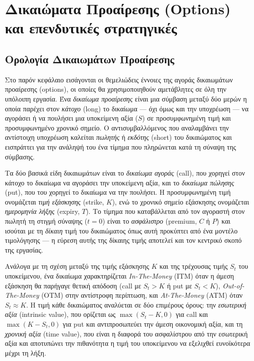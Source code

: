 \documentclass[12pt]{article}
\begin{document}
\newpage

\section{Δικαιώματα Προαίρεσης (Options) και επενδυτικές στρατηγικές}
\subsection{Ορολογία Δικαιωμάτων Προαίρεσης}

Στο παρόν κεφάλαιο εισάγονται οι θεμελιώδεις έννοιες της αγοράς δικαιωμάτων προαίρεσης (options), οι οποίες θα χρησιμοποιηθούν αμετάβλητες σε όλη την υπόλοιπη εργασία. Ένα \emph{δικαίωμα προαίρεσης} είναι μια σύμβαση μεταξύ δύο μερών η οποία παρέχει στον \emph{κάτοχο} (long) το δικαίωμα — όχι όμως και την υποχρέωση — να αγοράσει ή να πουλήσει μια υποκείμενη αξία ($S$) σε προσυμφωνημένη τιμή και προσυμφωνημένο χρονικό σημείο. Ο αντισυμβαλλόμενος που αναλαμβάνει την αντίστοιχη υποχρέωση καλείται \emph{πωλητής} ή \emph{εκδότης} (short) του δικαιώματος και εισπράττει για την ανάληψή του ένα τίμημα που πληρώνεται κατά τη σύναψη της σύμβασης.

Τα δύο βασικά είδη δικαιωμάτων είναι το \emph{δικαίωμα αγοράς} (call), που χορηγεί στον κάτοχο το δικαίωμα να αγοράσει την υποκείμενη αξία, και το \emph{δικαίωμα πώλησης} (put), που του χορηγεί το δικαίωμα να την πουλήσει. Η προσυμφωνημένη τιμή ονομάζεται \emph{τιμή εξάσκησης} (strike, $K$), ενώ το χρονικό σημείο εξάσκησης ονομάζεται \emph{ημερομηνία λήξης} (expiry, $T$). Το τίμημα που καταβάλλεται από τον αγοραστή στον πωλητή τη στιγμή σύναψης ($t = 0$) είναι το \emph{ασφάλιστρο} (premium, $C$ ή $P$) και ισούται με τη \emph{δίκαιη} τιμή του δικαιώματος όπως αυτή προκύπτει από ένα μοντέλο τιμολόγησης — η εύρεση αυτής της δίκαιης τιμής αποτελεί και τον κεντρικό σκοπό της εργασίας.

Ανάλογα με τη σχέση μεταξύ της τιμής εξάσκησης $K$ και της τρέχουσας τιμής $S_t$ του υποκείμενου, ένα δικαίωμα χαρακτηρίζεται \emph{In-The-Money} (ITM) όταν η άμεση εξάσκηση θα παρήγαγε θετική απόδοση (call με $S_t > K$ ή put με $S_t < K$), \emph{Out-of-The-Money} (OTM) στην αντίστροφη περίπτωση, και \emph{At-The-Money} (ATM) όταν $S_t \approx K$. Η τιμή κάθε δικαιώματος αναλύεται σε δύο επιμέρους όρους: την \emph{εσωτερική αξία} (intrinsic value), που ορίζεται ως $\max(S_t - K, 0)$ για call και $\max(K - S_t, 0)$ για put και αντιπροσωπεύει την άμεση οικονομική αξία, και τη \emph{χρονική αξία} (time value), που είναι η διαφορά του ασφαλίστρου από την εσωτερική αξία και αποτυπώνει την πιθανότητα η τιμή του υποκείμενου να εξελιχθεί ευνοϊκότερα μέχρι τη λήξη.
\end{document}
